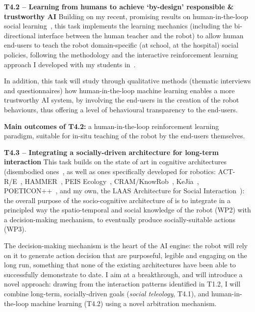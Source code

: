 \textbf{T4.2 -- Learning from humans to achieve `by-design' responsible \&
trustworthy AI}
Building on my recent, promising results on human-in-the-loop
social learning~\cite{senft2019teaching,winkle2020couch}, this task
implements the learning mechanics (including the bi-directional interface
between the human teacher and the robot) to allow human end-users to
teach the robot domain-specific (at school, at the hospital) social policies,
following the methodology and the interactive reinforcement learning approach I
developed with my students in~\cite{senft2017supervised}.

In addition, this task will study through qualitative methods (thematic
interviews and questionnaires) how human-in-the-loop machine learning enables a more
trustworthy AI system, by involving the end-users in the creation of the robot
behaviours, thus offering a level of behavioural transparency to the end-users.

\begin{framed}
    {\noindent\bf Main outcomes of T4.2:} a human-in-the-loop reinforcement
    learning paradigm, suitable for in-situ teaching of the robot by the
    end-users themselves.
\end{framed}

\textbf{T4.3 -- Integrating a socially-driven architecture for long-term interaction}
This task builds on the state of art in cognitive architectures (disembodied
ones~\cite{chong2007integrated,vernon2007survey,kingdon2008review,duch2008cognitive,langley2009cognitive,taatgen2010past,thorisson2012cognitive},
as well as ones specifically developed for robotics:
ACT-R/E~\cite{trafton2013act}, HAMMER~\cite{demiris2006hierarchical}, PEIS
Ecology~\cite{saffiotti2005peis,daoutis2012cooperative},
CRAM/KnowRob~\cite{beetz2010cram, tenorth2009knowrob},
KeJia~\cite{chen2010developing}, POETICON++~\cite{antunes2016from}, and my own,
the LAAS Architecture for Social Interaction~\cite{lemaignan2017artificial}):
the overall purpose of the socio-cognitive architecture of \project is to
integrate in a principled way the spatio-temporal and social knowledge of the
robot (WP2) with a decision-making mechanism, to eventually produce
socially-suitable actions (WP3). 

The decision-making mechanism is the heart of the \project AI engine: the robot
will rely on it to generate action decision that are purposeful, legible and engaging on the
long run, something that none of the existing architectures have been able to
successfully demonstrate to date. I aim at a breakthrough, and will
introduce a novel approach: drawing from the interaction patterns identified
in T1.2, I will combine long-term, socially-driven goals (\emph{social teleology}, T4.1), and
human-in-the-loop machine learning (T4.2) using a novel arbitration mechanism.

